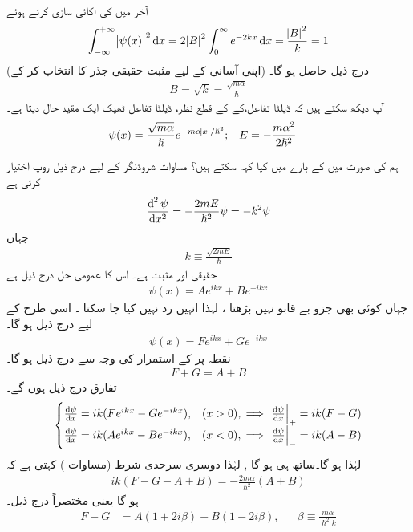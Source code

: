  آخر میں  کی اکائی سازی کرتے ہوئے 
\begin{align*}
\int_{-\infty}^{+\infty}\abs{\psi(x)}^2\dif x=2\abs{B}^2\int_0^{\infty}e^{-2kx}\dif x=\frac{\abs{B}^2}{k}=1
\end{align*}
 (اپنی آسانی کے لیے مثبت حقیقی جذر کا انتخاب کر کے)  درج ذیل حاصل ہو گا۔
\begin{align}
B=\sqrt{k}=\frac{\sqrt{m\alpha}}{\hslash}
\end{align}
آپ دیکھ سکتے ہیں کہ ڈیلٹا تفاعل،کے    کے قطع نظر،  ڈیلٹا تفاعل ٹھیک ایک مقید حال دیتا ہے۔ 
\begin{align}\label{مساوات_شروڈنگر_مقید_حال_ڈیلٹا}
\psi(x)&=\frac{\sqrt{m\alpha}}{\hslash}e^{-m\alpha\abs{x}/\hslash^2};&&E=-\frac{m\alpha^2}{2\hslash^2}
\end{align}

ہم  کی صورت میں  کے بارے میں کیا کہہ سکتے ہیں؟ مساوات شروڈنگر  کے لیے درج ذیل روپ اختیار کرتی ہے
\begin{align*}
\frac{\dif^{\,2}\psi}{\dif x^2}=-\frac{2mE}{\hslash^2}\psi=-k^2\psi
\end{align*}
 جہاں
\begin{align}\label{مساوات_شروڈنگر_مستقل_کے}
k\equiv\frac{\sqrt{2mE}}{\hslash}
\end{align}
 حقیقی اور مثبت ہے۔ اس کا عمومی حل درج ذیل ہے
\begin{align}\label{مساوات_شروڈنگر_بایاں_حل_ڈیلٹا}
\psi(x)=Ae^{ikx}+Be^{-ikx}
\end{align}
جہاں کوئی بھی جزو بے قابو نہیں بڑھتا ، لہٰذا انہیں رد نہیں کیا جا سکتا  ۔ اسی طرح  کے لیے درج ذیل ہو گا۔
\begin{align}\label{مساوات_شروڈنگر_دایاں_حل_ڈیلٹا}
\psi(x)=Fe^{ikx}+Ge^{-ikx}
\end{align}
نقطہ  پر  کے استمرار کی وجہ سے درج ذیل ہو گا۔
\begin{align}\label{مساوات_شروڈنگر_شرط_اول}
F+G=A+B
\end{align}
تفارق درج ذیل ہوں گے۔
\begin{align*}
\begin{cases}
\frac{\dif\psi}{\dif x}=ik(Fe^{ikx}-Ge^{-ikx}),& (x>0),\implies \left.\frac{\dif\psi}{\dif x}\right|_{+}=ik(F-G)\\
\frac{\dif\psi}{\dif x}=ik(Ae^{ikx}-Be^{-ikx}),& (x<0),\implies \left.\frac{\dif\psi}{\dif x}\right|_{-}=ik(A-B)
\end{cases}
\end{align*}
لہٰذا  ہو گا۔ساتھ ہی  ہو گا , لہٰذا دوسری سرحدی شرط (مساوات ) کہتی ہے کہ 
\begin{align}
ik(F-G-A+B)=-\frac{2m\alpha}{\hslash^2}(A+B)
\end{align}
 ہو گا یعنی مختصراً درج ذیل۔
\begin{align}\label{مساوات_شروڈنگر_شرط_دوم}
F-G&=A(1+2i\beta)-B(1-2i\beta),&&\beta\equiv\frac{m\alpha}{\hslash^2 k}
\end{align}

